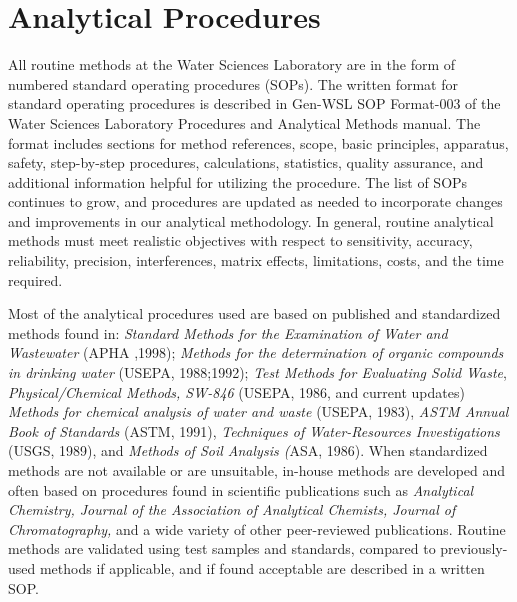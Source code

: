  

\section{Analytical Procedures}
All routine methods at the Water Sciences Laboratory are in the form of 
numbered standard operating procedures (SOPs). The written format for 
standard operating procedures is described in Gen-WSL SOP Format-003 of 
the Water Sciences Laboratory Procedures and Analytical Methods manual. 
The format includes sections for method references, scope, basic 
principles, apparatus, safety, step-by-step procedures, calculations, 
statistics, quality assurance, and additional information helpful for 
utilizing the procedure. The list of SOPs continues to grow, and 
procedures are updated as needed to incorporate changes and improvements 
in our analytical methodology. In general, routine analytical methods 
must meet realistic objectives with respect to sensitivity, accuracy, 
reliability, precision, interferences, matrix effects, limitations, 
costs, and the time required. 

Most of the analytical procedures used are based on published and 
standardized methods found in: \textit{Standard Methods for the 
Examination of Water and Wastewater }(APHA ,1998); \textit{Methods for 
the determination of organic compounds in drinking water }(USEPA, 
1988;1992); \textit{Test Methods for Evaluating Solid Waste}, 
\textit{Physical/Chemical Methods, SW-846} (USEPA, 1986, and current 
updates)\textit{ Methods for chemical analysis of water and waste} 
(USEPA, 1983), \textit{ASTM Annual Book of Standards }(ASTM, 1991), 
\textit{Techniques of Water-Resources Investigations }(USGS, 1989), 
and \textit{Methods of Soil Analysis (}ASA, 1986). When standardized 
methods are not available or are unsuitable, in-house methods are 
developed and often based on procedures found in scientific publications 
such as \textit{Analytical Chemistry, Journal of the Association of 
Analytical Chemists, Journal of Chromatography,} and a wide variety of 
other peer-reviewed publications. Routine methods are validated using 
test samples and standards, compared to previously-used methods if 
applicable, and if found acceptable are described in a written SOP. 

